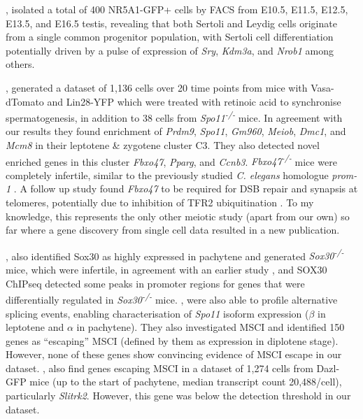 \cite{Stevant2018Deciphering}, isolated a total of 400 NR5A1-GFP+ cells by FACS from E10.5, E11.5, E12.5, E13.5, and E16.5 testis, revealing that both Sertoli and Leydig cells originate from a single common progenitor population, with Sertoli cell differentiation potentially driven by a pulse of expression of \textit{Sry}, \textit{Kdm3a}, and \textit{Nrob1} among others.

\cite{Chen2018Singlecell}, generated a dataset of 1,136 cells over 20 time points from mice with Vasa-dTomato and Lin28-YFP which were treated with retinoic acid to synchronise spermatogenesis, in addition to 38 cells from \textit{Spo11\textsuperscript{-/-}} mice. In agreement with our results they found enrichment of \textit{Prdm9}, \textit{Spo11}, \textit{Gm960}, \textit{Meiob}, \textit{Dmc1}, and \textit{Mcm8} in their leptotene \& zygotene cluster C3. They also detected novel enriched genes in this cluster \textit{Fbxo47}, \textit{Pparg}, and \textit{Ccnb3}. \textit{Fbxo47\textsuperscript{-/-}} mice were completely infertile, similar to the previously studied \textit{C. elegans} homologue \textit{prom-1} \parencite{Jantsch2007Caenorhabditis}. A follow up study found \textit{Fbxo47} to be required for DSB repair and synapsis at telomeres, potentially due to inhibition of TFR2 ubiquitination \parencite{Hua2019FBXO47}. To my knowledge, this represents the only other meiotic study (apart from our own) so far where a gene discovery from single cell data resulted in a new publication.

\cite{Chen2018Singlecell}, also identified Sox30 as highly expressed in pachytene and generated \textit{Sox30\textsuperscript{-/-}} mice, which were infertile, in agreement with an earlier study \parencite{Feng2017SOX30}, and SOX30 ChIPseq detected some peaks in promoter regions for genes that were differentially regulated in \textit{Sox30\textsuperscript{-/-}} mice. \cite{Chen2018Singlecell}, were also able to profile alternative splicing events, enabling characterisation of \textit{Spo11} isoform expression ($\beta$ in leptotene and $\alpha$ in pachytene). They also investigated MSCI and identified 150 genes as ``escaping'' MSCI (defined by them as expression in diplotene stage). However, none of these genes show convincing evidence of MSCI escape in our dataset. \cite{Vertesy2019Dynamics}, also find genes escaping MSCI in a dataset of 1,274 cells from Dazl-GFP mice (up to the start of pachytene, median transcript count 20,488/cell), particularly \textit{Slitrk2}. However, this gene was below the detection threshold in our dataset.

